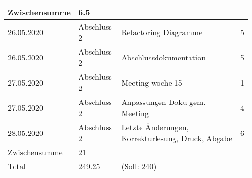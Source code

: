 \documentclass[
	ngerman,
	toc=listof, %
	toc=bibliography, %
	footnotes=multiple, %
	parskip=half, %
	numbers=noendperiod %
]{scrartcl}
\begin{document}
\begin{tabularx}{\textwidth}{llXl}
		\midrule
		Zwischensumme & 6.5 & & \\
		\midrule
		26.05.2020 & Abschluss 2 & Refactoring Diagramme & 5 \\
		26.05.2020 & Abschluss 2 & Abschlussdokumentation & 5 \\
		27.05.2020 & Abschluss 2 & Meeting woche 15 & 1 \\
		27.05.2020 & Abschluss 2 & Anpassungen Doku gem. Meeting & 4 \\
		28.05.2020 & Abschluss 2 & Letzte Änderungen, Korrekturlesung, Druck, Abgabe & 6 \\
		\midrule 
		Zwischensumme & 21 & & \\
		\midrule
		Total & 249.25 & (Soll: 240) & \\
		\bottomrule
	\end{tabularx}
\end{document}
